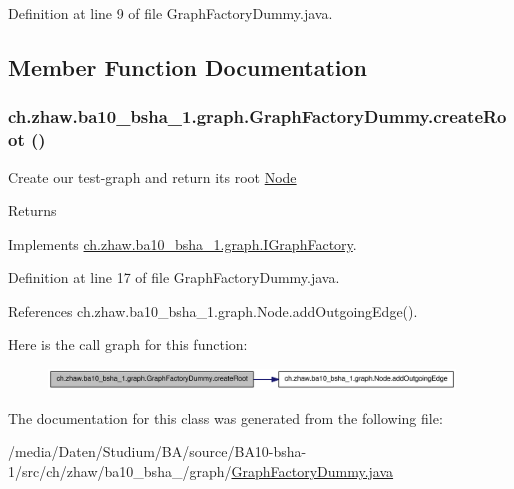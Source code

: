Definition at line 9 of file GraphFactoryDummy.java.

\subsection{Member Function Documentation}
\hypertarget{classch_1_1zhaw_1_1ba10__bsha__1_1_1graph_1_1GraphFactoryDummy_aee963953d9d848498caf25bf30cbe8bf}{
\subsubsection[{createRoot}]{ ch.zhaw.ba10\_\-bsha\_\-1.graph.GraphFactoryDummy.createRoot ()}}
\label{classch_1_1zhaw_1_1ba10__bsha__1_1_1graph_1_1GraphFactoryDummy_aee963953d9d848498caf25bf30cbe8bf}
Create our test-\/graph and return its root \hyperlink{classch_1_1zhaw_1_1ba10__bsha__1_1_1graph_1_1Node}{Node}

\begin{DoxyReturn}{Returns}

\end{DoxyReturn}


Implements \hyperlink{interfacech_1_1zhaw_1_1ba10__bsha__1_1_1graph_1_1IGraphFactory_a714465d240775f8a383c0a65356c4add}{ch.zhaw.ba10\_\-bsha\_\-1.graph.IGraphFactory}.

Definition at line 17 of file GraphFactoryDummy.java.

References ch.zhaw.ba10\_\-bsha\_\-1.graph.Node.addOutgoingEdge().

Here is the call graph for this function:\nopagebreak
\begin{figure}[H]
\begin{center}
\leavevmode
\includegraphics[width=306pt]{classch_1_1zhaw_1_1ba10__bsha__1_1_1graph_1_1GraphFactoryDummy_aee963953d9d848498caf25bf30cbe8bf_cgraph}
\end{center}
\end{figure}


The documentation for this class was generated from the following file:\begin{DoxyCompactItemize}
\item 
/media/Daten/Studium/BA/source/BA10-\/bsha-\/1/src/ch/zhaw/ba10\_\-bsha\_/graph/\hyperlink{GraphFactoryDummy_8java}{GraphFactoryDummy.java}\end{DoxyCompactItemize}
